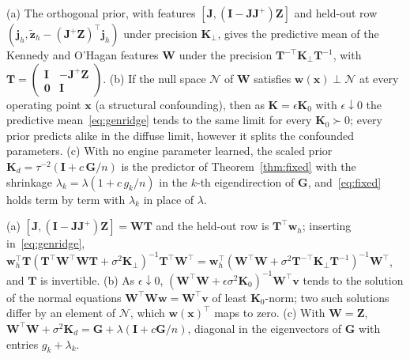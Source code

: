 \begin{proposition}\label{prop:priors}
(a) The orthogonal prior, with features $[\mathbf J,(\mathbf I-\mathbf J\mathbf J^{+})\mathbf Z]$ and held-out row $(\mathbf
j_h,\tilde{\mathbf z}_h-(\mathbf J^{+}\mathbf Z)^{\top}\mathbf j_h)$ under precision $\mathbf K_\perp$, gives the predictive mean
of the Kennedy and O'Hagan features $\mathbf W$ under the precision $\mathbf T^{-\top}\mathbf K_\perp\mathbf T^{-1}$, with
$\mathbf T=\begin{pmatrix}\mathbf I&-\mathbf J^{+}\mathbf Z\\ \mathbf 0&\mathbf I\end{pmatrix}$.
(b) If the null space $\mathcal N$ of $\mathbf W$ satisfies $\mathbf w(\mathbf x)\perp\mathcal N$ at every operating point
$\mathbf x$ (a structural confounding), then as $\mathbf K=\epsilon\mathbf K_0$ with $\epsilon\downarrow0$ the predictive
mean~\eqref{eq:genridge} tends to the same limit for every $\mathbf K_0\succ0$; every prior predicts alike in the diffuse limit,
however it splits the confounded parameters.
(c) With no engine parameter learned, the scaled prior $\mathbf K_d=\tau^{-2}(\mathbf I+c\,\mathbf G/n)$ is the predictor of
Theorem~\ref{thm:fixed} with the shrinkage $\lambda_k=\lambda(1+c\,g_k/n)$ in the $k$-th eigendirection of $\mathbf G$,
and~\eqref{eq:fixed} holds term by term with $\lambda_k$ in place of $\lambda$.
\end{proposition}
\begin{IEEEproof}
(a) $[\mathbf J,(\mathbf I-\mathbf J\mathbf J^{+})\mathbf Z]=\mathbf W\mathbf T$ and the held-out row is $\mathbf T^{\top}\mathbf w_h$;
inserting in~\eqref{eq:genridge}, $\mathbf w_h^{\top}\mathbf T(\mathbf T^{\top}\mathbf W^{\top}\mathbf W\mathbf T+\sigma^2\mathbf
K_\perp)^{-1}\mathbf T^{\top}\mathbf W^{\top}=\mathbf w_h^{\top}(\mathbf W^{\top}\mathbf W+\sigma^2\mathbf T^{-\top}\mathbf K_\perp\mathbf
T^{-1})^{-1}\mathbf W^{\top}$, and $\mathbf T$ is invertible. (b) As $\epsilon\downarrow0$, $(\mathbf W^{\top}\mathbf W+\epsilon\sigma^2\mathbf
K_0)^{-1}\mathbf W^{\top}\mathbf v$ tends to the solution of the normal equations $\mathbf W^{\top}\mathbf W\mathbf w=\mathbf W^{\top}\mathbf
v$ of least $\mathbf K_0$-norm; two such solutions differ by an element of $\mathcal N$, which $\mathbf w(\mathbf x)^{\top}$ maps to zero.
(c) With $\mathbf W=\mathbf Z$, $\mathbf W^{\top}\mathbf W+\sigma^2\mathbf K_d=\mathbf G+\lambda(\mathbf I+c\mathbf G/n)$, diagonal in the
eigenvectors of $\mathbf G$ with entries $g_k+\lambda_k$.
\end{IEEEproof}

